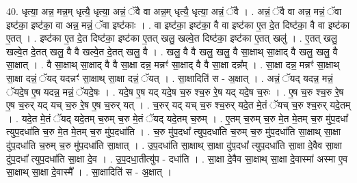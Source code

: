 \documentclass[17pt]{extarticle}
\begin{document}
40. धृत्या॒ अन्न॒ मन्न॒म् धृत्यै॒ धृत्या॒ अन्नं॒ ॅवै वा अन्न॒म् धृत्यै॒ धृत्या॒ अन्नं॒ ॅवै । . अन्नं॒ ॅवै वा अन्न॒ मन्नं॒ ॅवा इष्ट॑का॒ इष्ट॑का॒ वा अन्न॒ मन्नं॒ ॅवा इष्ट॑काः । . वा इष्ट॑का॒ इष्ट॑का॒ वै वा इष्ट॑का ए॒त दे॒त दिष्ट॑का॒ वै वा इष्ट॑का ए॒तत् । . इष्ट॑का ए॒त दे॒त दिष्ट॑का॒ इष्ट॑का ए॒तत् खलु॒ खल्वे॒त दिष्ट॑का॒ इष्ट॑का ए॒तत् खलु॑ । . ए॒तत् खलु॒ खल्वे॒त दे॒तत् खलु॒ वै वै खल्वे॒त दे॒तत् खलु॒ वै । . खलु॒ वै वै खलु॒ खलु॒ वै सा॒क्षाथ् सा॒क्षाद् वै खलु॒ खलु॒ वै सा॒क्षात् । . वै सा॒क्षाथ् सा॒क्षाद् वै वै सा॒क्षा दन्न॒ मन्नꣳ॑ सा॒क्षाद् वै वै सा॒क्षा दन्न᳚म् । . सा॒क्षा दन्न॒ मन्नꣳ॑ सा॒क्षाथ् सा॒क्षा दन्नं॒ ॅयद् यदन्नꣳ॑ सा॒क्षाथ् सा॒क्षा दन्नं॒ ॅयत् । . सा॒क्षादिति॑ स - अ॒क्षात् । . अन्नं॒ ॅयद् यदन्न॒ मन्नं॒ ॅयदे॒ष ए॒ष यदन्न॒ मन्नं॒ ॅयदे॒षः । . यदे॒ष ए॒ष यद् यदे॒ष च॒रु श्च॒रु रे॒ष यद् यदे॒ष च॒रुः । . ए॒ष च॒रु श्च॒रु रे॒ष ए॒ष च॒रुर् यद् यच् च॒रु रे॒ष ए॒ष च॒रुर् यत् । . च॒रुर् यद् यच् च॒रु श्च॒रुर् यदे॒त मे॒तं ॅयच् च॒रु श्च॒रुर् यदे॒तम् । . यदे॒त मे॒तं ॅयद् यदे॒तम् च॒रुम् च॒रु मे॒तं ॅयद् यदे॒तम् च॒रुम् । . ए॒तम् च॒रुम् च॒रु मे॒त मे॒तम् च॒रु मु॑प॒दधा᳚ त्युप॒दधा॑ति च॒रु मे॒त मे॒तम् च॒रु मु॑प॒दधा॑ति । . च॒रु मु॑प॒दधा᳚ त्युप॒दधा॑ति च॒रुम् च॒रु मु॑प॒दधा॑ति सा॒क्षाथ् सा॒क्षा दु॑प॒दधा॑ति च॒रुम् च॒रु मु॑प॒दधा॑ति सा॒क्षात् । . उ॒प॒दधा॑ति सा॒क्षाथ् सा॒क्षा दु॑प॒दधा᳚ त्युप॒दधा॑ति सा॒क्षा दे॒वैव सा॒क्षा दु॑प॒दधा᳚ त्युप॒दधा॑ति सा॒क्षा दे॒व । . उ॒प॒दधा॒तीत्यु॑प - दधा॑ति । . सा॒क्षा दे॒वैव सा॒क्षाथ् सा॒क्षा दे॒वास्मा॑ अस्मा ए॒व सा॒क्षाथ् सा॒क्षा दे॒वास्मै᳚ । . सा॒क्षादिति॑ स - अ॒क्षात् । \newline
\pagebreak
{}
\end{document}

